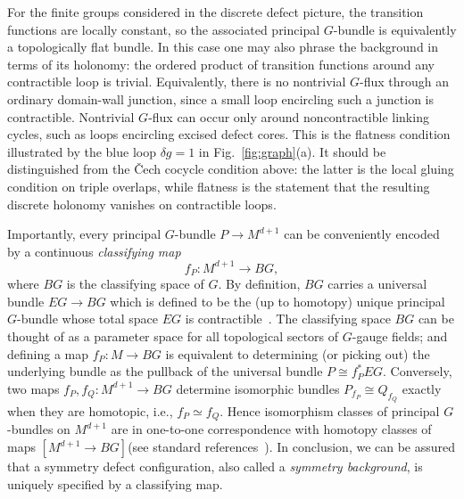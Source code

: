 \documentclass[aps,prx,reprint,superscriptaddress,twocolumn,amsmath,amssymb,amsfonts, nofootinbib]{revtex4-2}
\theoremstyle{apsstyle}
\begin{document}
\bigskip 

For the finite groups considered in the discrete defect picture, the transition functions are locally constant, so the associated principal $G$-bundle is equivalently a topologically flat bundle. In this case one may also phrase the background in terms of its holonomy: the ordered product of transition functions around any contractible loop is trivial. Equivalently, there is no nontrivial $G$-flux through an ordinary domain-wall junction, since a small loop encircling such a junction is contractible. Nontrivial $G$-flux can occur only around noncontractible linking cycles, such as loops encircling excised defect cores. 
This is the flatness condition illustrated by the blue loop $\delta g=1$ in Fig.~\ref{fig:graph}(a). It should be distinguished from the \v{C}ech cocycle condition above: the latter is the local gluing condition on triple overlaps, while flatness is the statement that the resulting discrete holonomy vanishes on contractible loops.

\bigskip 

Importantly, every principal $G$-bundle $P  \to  M^{d+1}$ can be conveniently encoded by a continuous \emph{classifying map}
\begin{equation*}
f_{P} : M^{d+1} \longrightarrow BG,
\end{equation*}
where $BG$ is the classifying space of $G$. By definition, $BG$ carries a universal bundle $EG  \to  BG$ which is defined to be the (up to homotopy) unique principal $G$-bundle whose total space $EG$ is contractible~\cite{note_universalbundle}. The classifying space $BG$ can be thought of as a parameter space for all topological sectors of $G$-gauge fields; and defining a map $f_{P}: M\to BG$ is equivalent to determining (or picking out) the underlying bundle as the pullback of the universal bundle $P \cong f_{P}^{*}EG$. Conversely, two maps $f_P,f_Q : M^{d+1} \to BG$ determine isomorphic bundles $P_{f_P} \cong  Q_{f_Q}$ exactly when they are homotopic, i.e., $f_{P}\simeq f_{Q}$.  Hence isomorphism classes of principal $G$-bundles on $M^{d+1}$ are in one-to-one correspondence with homotopy classes of maps $[M^{d+1}\to BG]$(see standard references~\cite{Hatcher_VB, Nakahara2018, Eguchi1980}). In conclusion, we can be assured that a symmetry defect configuration, also called a \textit{symmetry background}, is uniquely specified by a classifying map. 

\medskip 
\end{document}
